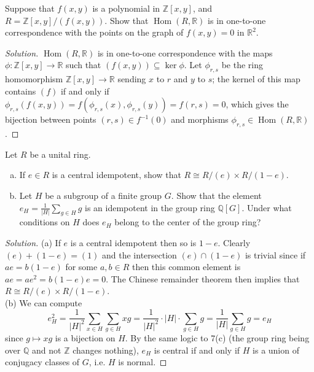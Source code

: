 \documentclass[10pt]{article}
\providecommand{\QQ}{\mathbb Q}
\providecommand{\RR}{\mathbb R}
\providecommand{\ZZ}{\mathbb Z}
\providecommand{\ii}{\item}
\providecommand{\inv}{^{-1}}
\newenvironment{soln}{\begin{proof}[Solution]}{\end{proof}}
\providecommand{\abs}[1]{\left|#1\right|}
\providecommand{\Hom}{\operatorname{Hom}}
\begin{document}
\begin{problem}
    Suppose that $f(x,y)$ is a polynomial in $\ZZ[x,y]$, and
    $R = \ZZ[x,y]/(f(x,y))$. Show that $\Hom(R,\RR)$ is in
    one-to-one correspondence with the points on the graph of
    $f(x,y) = 0$ in $\RR^2$.
\end{problem}

\begin{soln}
    $\Hom(R,\RR)$ is in one-to-one correspondence with
    the maps $\phi\colon\ZZ[x,y]\to\RR$ such that $(f(x,y))\subseteq\ker\phi$.
    Let $\phi_{r,s}$ be the ring homomorphism
    $\ZZ[x,y]\to\RR$ sending $x$ to $r$ and $y$ to $s$;
    the kernel of this map contains $(f)$ if and only if
    $\phi_{r,s}(f(x,y)) = f(\phi_{r,s}(x), \phi_{r,s}(y)) = f(r,s) = 0$,
    which gives the bijection between points $(r,s) \in f\inv(0)$
    and morphisms $\phi_{r,s}\in\Hom(R,\RR)$.
\end{soln}

\begin{problem}
    Let $R$ be a unital ring.
    \begin{enumerate}[(a)]
        \ii If $e\in R$ is a central idempotent, show that
	$R\cong R/(e)\times R/(1-e)$.
	\ii Let $H$ be a subgroup of a finite group $G$.
	Show that the element $e_H = \frac 1{\abs H}\sum_{g\in H}g$
	is an idempotent in the group ring $\QQ[G]$.
	Under what conditions on $H$ does $e_H$ belong to
	the center of the group ring?
    \end{enumerate}
\end{problem}

\begin{soln}
    (a) If $e$ is a central idempotent then so is $1-e$.
    Clearly $(e) + (1-e) = (1)$
    and the intersection $(e)\cap(1-e)$ is trivial since
    if $ae = b(1-e)$ for some $a,b\in R$ then this common element is
    $ae = ae^2 = b(1-e)e = 0$.
    The Chinese remainder theorem then implies that
    $R\cong R/(e)\times R/(1-e)$.
    \\
    
    (b) We can compute
    \begin{equation*}
	e^2_H = \frac 1{|H|^2} \sum_{x\in H}\sum_{g\in H} xg
	= \frac1{|H|^2} \cdot \abs H\cdot\sum_{g\in H}g
	= \frac 1{\abs H}\sum_{g\in H}g = e_H
    \end{equation*}
    since $g\mapsto xg$ is a bijection on $H$.
    By the same logic to 7(c) (the group ring being over $\QQ$
    and not $\ZZ$ changes nothing), $e_H$ is central if and only if
    $H$ is a union of conjugacy classes of $G$, i.e. $H$ is normal.
\end{soln}
\end{document}
